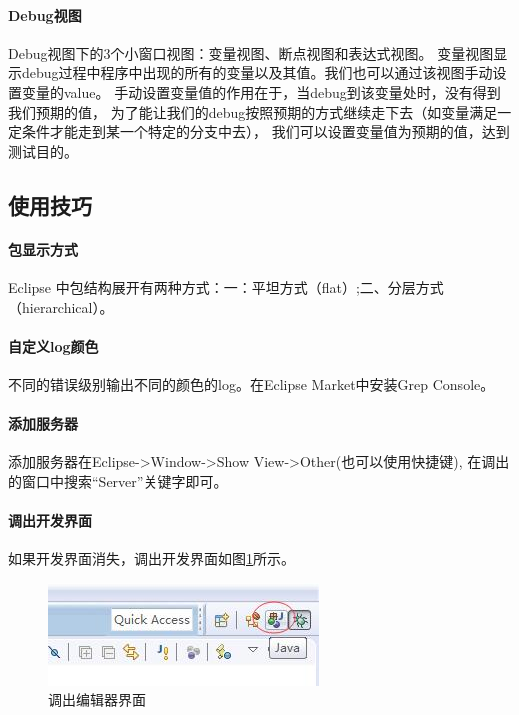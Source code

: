 \documentclass{book}
\begin{document}
\paragraph{Debug视图}

Debug视图下的3个小窗口视图：变量视图、断点视图和表达式视图。
变量视图显示debug过程中程序中出现的所有的变量以及其值。我们也可以通过该视图手动设置变量的value。
手动设置变量值的作用在于，当debug到该变量处时，没有得到我们预期的值，
为了能让我们的debug按照预期的方式继续走下去（如变量满足一定条件才能走到某一个特定的分支中去），
我们可以设置变量值为预期的值，达到测试目的。

\subsection{使用技巧}

\paragraph{包显示方式}
Eclipse 中包结构展开有两种方式：一：平坦方式（flat）;二、分层方式（hierarchical）。

\paragraph{自定义log颜色}
不同的错误级别输出不同的颜色的log。在Eclipse Market中安装Grep Console。

\paragraph{添加服务器}
添加服务器在Eclipse->Window->Show View->Other(也可以使用快捷键),
在调出的窗口中搜索“Server”关键字即可。

\paragraph{调出开发界面}
如果开发界面消失，调出开发界面如图\ref{code:DevelopWindow}所示。

\begin{figure}[htbp]
	\centering
	\includegraphics[scale=0.6]{DevelopWindow.jpg}
	\caption{调出编辑器界面}
	\label{code:DevelopWindow}
\end{figure}
\end{document}
